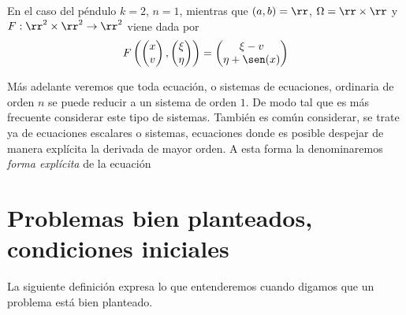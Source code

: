 \begin{ejemplo}
 En el caso del péndulo  $k=2$, $n=1$, mientras que $(a,b)=\rr$, $\Omega=\rr\times\rr$ y
 $F:\rr^2\times \rr^2\to\rr^2$ viene dada por
 \[F\left(\begin{pmatrix}
      x \\ v
     \end{pmatrix}
,\begin{pmatrix}
  \xi \\ \eta 
  \end{pmatrix}
  \right)
  =\begin{pmatrix} \xi-v \\ \eta+\sen(x)  \end{pmatrix}
\]
\end{ejemplo}
Más adelante veremos que toda ecuación, o sistemas de ecuaciones, ordinaria de orden $n$ 
se puede reducir a un sistema de orden $1$. De modo tal que es más frecuente considerar
este tipo de sistemas. También es común considerar, se trate ya de ecuaciones 
escalares o sistemas,
 ecuaciones donde es posible despejar 
de manera explícita la derivada de mayor orden. A esta forma la denominaremos 
\emph{forma explícita} de la ecuación


\section{Problemas bien planteados, condiciones iniciales}

La siguiente definición expresa lo que entenderemos cuando digamos que un problema está bien planteado.


